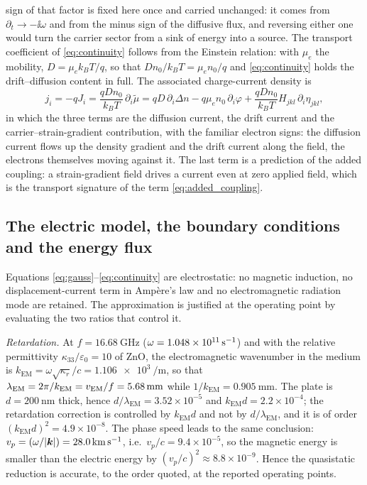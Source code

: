 sign of that factor is fixed here once and carried unchanged: it comes from
$\partial_t\to-\ii\omega$ and from the minus sign of the diffusive flux, and
reversing either one would turn the carrier sector from a sink of energy into a
source.  The
transport coefficient of \eqref{eq:continuity} follows from the Einstein
relation: with $\mu_e$ the mobility, $D=\mu_ek_BT/q$, so that
$Dn_0/k_BT=\mu_en_0/q$ and \eqref{eq:continuity} holds the drift--diffusion content in full.  The associated charge-current density is
\begin{equation}
\label{eq:current}
j_i=-qJ_i=\frac{qDn_0}{k_BT}\,\partial_i\widetilde\mu
=qD\,\partial_i\Delta n-q\mu_e n_0\,\partial_i\varphi
+\frac{qDn_0}{k_BT}H_{jkl}\,\partial_i\eta_{jkl},
\end{equation}
in which the three terms are the diffusion current, the drift current and the
carrier--strain-gradient contribution, with the familiar electron signs: the
diffusion current flows up the density gradient and the drift current along
the field, the electrons themselves moving against it.  The last term is a prediction of the added coupling: a
strain-gradient field drives a current even at zero applied field, which is the
transport signature of the term \eqref{eq:added_coupling}.


\subsection{The electric model, the boundary conditions and the energy flux}
\label{sec:governing_electric}
\label{sec:governing_bc}
\label{sec:governing_energy}

Equations \eqref{eq:gauss}--\eqref{eq:continuity} are electrostatic: no
magnetic induction, no displacement-current term in Amp\`ere's law and no
electromagnetic radiation mode are retained.  The approximation is justified at the operating point by evaluating the two
ratios that control it.

\emph{Retardation.}  At $f=\SI{16.68}{\giga\hertz}$ ($\omega=\SI{1.048e11}{%
\per\second}$) and with the relative permittivity $\kappa_{33}/\varepsilon_0=10$
of ZnO, the electromagnetic wavenumber in the medium is
$k_{\mathrm{EM}}=\omega\sqrt{\kappa_r}/c=\SI{1.106e3}{\per\metre}$, so that
$\lambda_{\mathrm{EM}}=2\pi/k_{\mathrm{EM}}=v_{\mathrm{EM}}/f=\SI{5.68}{%
\milli\metre}$ while $1/k_{\mathrm{EM}}=\SI{0.905}{\milli\metre}$.  The plate is
$d=\SI{200}{\nano\metre}$ thick, hence $d/\lambda_{\mathrm{EM}}=3.52\times10^{-5}$
and $k_{\mathrm{EM}}d=2.2\times10^{-4}$; the retardation correction is
controlled by $k_{\mathrm{EM}}d$ and not by $d/\lambda_{\mathrm{EM}}$, and it is
of order $(k_{\mathrm{EM}}d)^2=4.9\times10^{-8}$.  The phase speed leads to the same conclusion:
$v_p=(\omega/|\boldsymbol{k}|)=\SI{28.0}{\kilo\metre\per\second}$, i.e.\
$v_p/c=9.4\times10^{-5}$, so the magnetic energy is smaller than the electric
energy by $(v_p/c)^2\approx8.8\times10^{-9}$.  Hence the quasistatic reduction is accurate, to the order quoted, at the
reported operating points.

